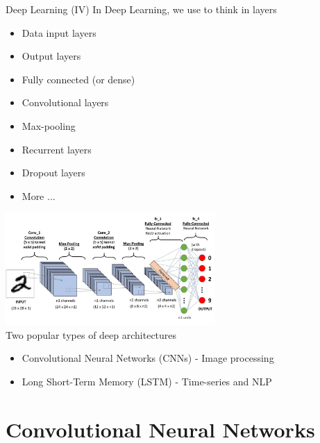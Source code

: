 \documentclass[10pt,compress]{beamer} %
\begin{document}
\begin{frame}{Deep Learning (IV)}
	In Deep Learning, we use to think in layers
	\begin{itemize}
		\item Data input layers
		\item Output layers
        	\item Fully connected (or dense)
        	\item Convolutional layers
        	\item Max-pooling
        	\item Recurrent layers
        	\item Dropout layers
        	\item More ...
	\end{itemize}

    \vspace{-3.5cm}
	\hfill \includegraphics[width=0.6\textwidth]{figs/layers.png}\\

	Two popular types of deep architectures
	\begin{itemize}
		\item Convolutional Neural Networks (CNNs) - Image processing
		\item Long Short-Term Memory (LSTM) - Time-series and NLP 
	\end{itemize}
\end{frame}

\section{Convolutional Neural Networks}
\end{document}
